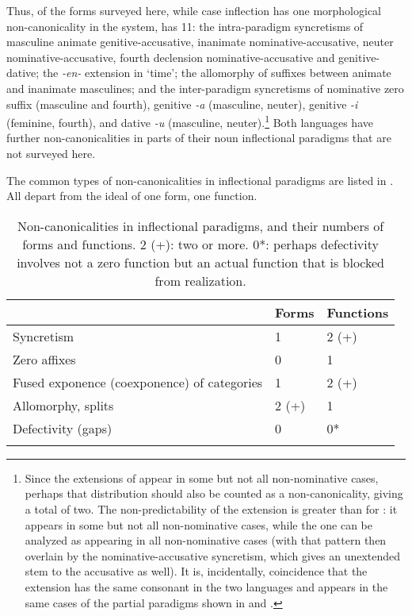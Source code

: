 \documentclass[output=collectionpaper]{langsci/langscibook}
\begin{document}
Thus, of the forms surveyed here, while  case inflection has one morphological non-canonicality in the system,  has 11: the intra-paradigm syncretisms of masculine animate genitive-accusative, inanimate nominative\hyp{}accusative, neuter nominative\hyp{}accusative, fourth declension nominative-accusative and genitive\hyp{}dative; the \textit{-en-} extension in `time'; the allomorphy of suffixes between animate and inanimate masculines; and the inter-paradigm syncretisms of nominative zero suffix (masculine and fourth), genitive \textit{-a} (masculine, neuter), genitive \textit{-i} (feminine, fourth), and dative \textit{-u} (masculine, neuter).\footnote{%
Since the extensions of  appear in some but not all non-nominative cases, perhaps that distribution should also be counted as a non-canonicality, giving  a total of two. The non-predictability of the  extension is greater than for : it appears in some but not all non-nominative cases, while the  one can be analyzed as appearing in all non-nominative cases (with that pattern then overlain by the nominative-accusative syncretism, which gives an unextended stem to the accusative as well). It is, incidentally, coincidence that the extension has the same consonant in the two languages and appears in the same cases of the partial paradigms shown in  and .
} %
Both languages have further non-canonicalities in parts of their noun inflectional paradigms that are not surveyed here.

The common types of non-canonicalities in inflectional paradigms are listed in . All depart from the ideal of one form, one function.


\begin{table}
\caption{Non-canonicalities in inflectional paradigms, and their numbers of forms and functions.  2 (+): two or more. 0*: perhaps defectivity involves not a zero function but an actual function that is blocked from realization.}
\label{extab:Nich:3}

\begin{tabularx}{\textwidth}{lXl}
\lsptoprule

						&		Forms &	Functions	\\
			 \midrule
	Syncretism	 &					1 &	2 (+)	\\
	Zero affixes	 &					0 &	1	\\
	Fused exponence (coexponence) of categories	 &1 &	2 (+)	\\
	Allomorphy, splits		 &			2 (+)	 &1	\\
	Defectivity (gaps)		 &			0 &	0*
\\\lspbottomrule\end{tabularx}
\end{table}
\end{document}

